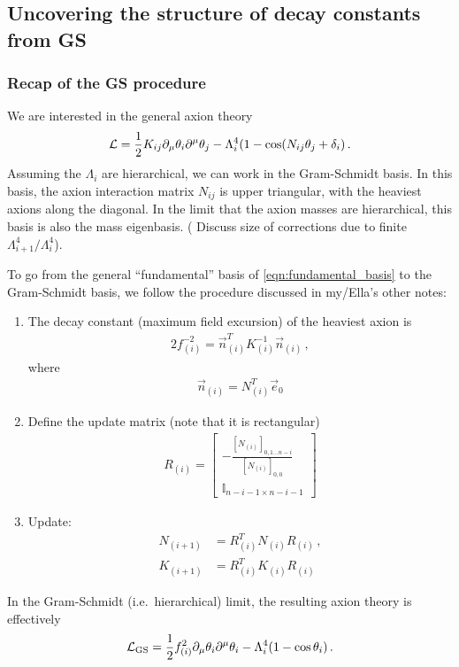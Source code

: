 \documentclass[11pt]{article}
\begin{document}
\subsection{Uncovering the structure of decay constants from GS}

\subsubsection{Recap of the GS procedure}
We are interested in the general axion theory
\begin{align}\label{eqn:fundamental_basis}
    {\cal L} = \frac12 K_{ij}\partial_\mu\theta_i\partial^\mu\theta_j - \Lambda_i^4(1 - \cos(N_{ij}\theta_j + \delta_i)\,.
\end{align}
Assuming the $\Lambda_i$ are hierarchical, we can work in the Gram-Schmidt basis. In this basis, the axion interaction matrix $N_{ij}$ is upper triangular, with the heaviest axions along the diagonal. In the limit that the axion masses are hierarchical, this basis is also the mass eigenbasis. ({\color{red} Discuss size of corrections due to finite ${\Lambda_{i + 1}^4}/\Lambda_i^4$}\color{black}).

To go from the general ``fundamental'' basis of \cref{eqn:fundamental_basis} to the Gram-Schmidt basis, we follow the procedure discussed in my/Ella's other notes:
\begin{enumerate}
    \item The decay constant (maximum field excursion) of the heaviest axion is 
    \begin{align}\label{eqn:decay_constants}
        2f_{(i)}^{-2} = \vec n_{(i)}^T K_{(i)}^{-1}\vec n_{(i)}\,,
    \end{align}
    where
    \begin{align}
        \vec n_{(i)}= N_{(i)}^T\vec e_0
    \end{align}
    \item Define the update matrix (note that it is rectangular)
    \begin{align}
        R_{(i)} = \left[\begin{array}{c}-\frac{[N_{(i)}]_{0,1\dots n-i}}{[N_{(i)}]_{0,0}}\\{\mathbb I}_{n-i-1\times n-i-1}\end{array}\right]
    \end{align}
    \item Update:
    \begin{align}
        N_{(i + 1)} &= R_{(i)}^T N_{(i)}R_{(i)}\,,\\
        K_{(i + 1)} &= R_{(i)}^T K_{(i)}R_{(i)}
    \end{align}
\end{enumerate}
In the Gram-Schmidt (i.e.\ hierarchical) limit, the resulting axion theory is effectively
\begin{align}
    {\cal L}_{\rm GS} = \frac12 f_{(i)}^2\partial_\mu\theta_i\partial^\mu\theta_i - \Lambda_i^4(1 - \cos\theta_i)\,.
\end{align}
\end{document}
